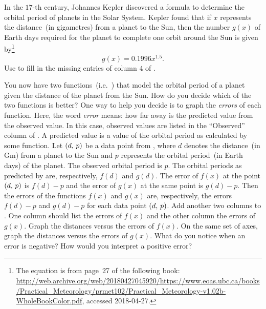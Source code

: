 \documentclass[a4paper,oneside,12pt]{article}
\begin{document}
\begin{problem}
\begin{packedenum}
  \item\label{subprob:planetary_orbit_Kepler}
    In the $17$-th century, Johannes Kepler discovered a formula to
    determine the orbital period of planets in the Solar System.
    Kepler found that if $x$ represents the distance~(in gigametres)
    from a planet to the Sun, then the number $g(x)$ of Earth days
    required for the planet to complete one orbit around the Sun is
    given by\footnote{
      The equation is from page~27 of the following book:
      \url{http://web.archive.org/web/20180427045920/https://www.eoas.ubc.ca/books/Practical_Meteorology/prmet102/Practical_Meteorology-v1.02b-WholeBookColor.pdf},
      accessed 2018-04-27.
    }
    \begin{equation}
    \label{eqn:Earth_days_orbit_Kepler}
    g(x)
    =
    0.1996x^{1.5}.
    \end{equation}
    Use  to fill in the missing
    entries of column $4$ of .

  \item\label{subprob:planetary_orbit_comparison}
    You now have two
    functions~(i.e.~)
    that model the orbital period of a planet given the distance of
    the planet from the Sun.  How do you decide which of the two
    functions is better?  One way to help you decide is to graph the
    \emph{errors} of each function.  Here, the word \emph{error}
    means: how far away is the predicted value from the observed
    value.  In this case, observed values are listed in the
    ``Observed'' column of .  A
    predicted value is a value of the orbital period as calculated by
    some function.  Let $\left\lparen{d},\, {p}\right\rparen$ be a data point from
    , where $d$ denotes the
    distance~(in Gm) from a planet to the Sun and $p$ represents the
    orbital period~(in Earth days) of the planet.  The observed
    orbital period is $p$.  The orbital periods as predicted by
    are, respectively, $f(d)$ and $g(d)$.  The error of $f(x)$ at the
    point $\left\lparen{d},\, {p}\right\rparen$ is $f(d) - p$ and the error of $g(x)$ at the
    same point is $g(d) - p$.  Then the errors of the functions $f(x)$
    and $g(x)$ are, respectively, the errors $f(d) - p$ and $g(d) - p$
    for each data point $\left\lparen{d},\, {p}\right\rparen$.  Add another two columns to
    .  One column should list the
    errors of $f(x)$ and the other column the errors of $g(x)$.  Graph
    the distances versus the errors of $f(x)$.  On the same set of
    axes, graph the distances versus the errors of $g(x)$.  What do
    you notice when an error is negative?  How would you interpret a
    positive error?


\end{packedenum}
\end{problem}
\end{document}
